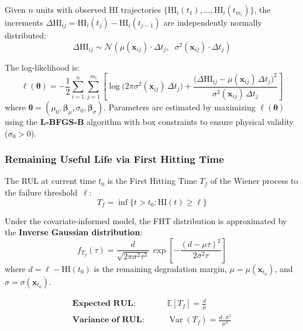 \documentclass[12pt, a4paper]{article}
\newcommand{\E}{\mathbb{E}}
\newcommand{\Var}{\operatorname{Var}}
\newcommand{\HI}{\mathrm{HI}}
\begin{document}
Given $n$ units with observed HI trajectories $\{\HI_i(t_1), \ldots, \HI_i(t_{m_i})\}$, the increments $\Delta\HI_{ij} = \HI_i(t_j) - \HI_i(t_{j-1})$ are independently normally distributed:
\begin{equation}
    \Delta\HI_{ij} \sim \mathcal{N}\!\left(\mu(\mathbf{x}_{ij})\cdot\Delta t_j,\;\; \sigma^2(\mathbf{x}_{ij})\cdot\Delta t_j\right)
\end{equation}

The log-likelihood is:
\begin{equation}\label{eq:wiener-ll}
    \ell(\boldsymbol{\theta}) = -\frac{1}{2}\sum_{i=1}^{n}\sum_{j=1}^{m_i}\left[\log\!\bigl(2\pi\sigma^2(\mathbf{x}_{ij})\,\Delta t_j\bigr) + \frac{\bigl(\Delta\HI_{ij} - \mu(\mathbf{x}_{ij})\,\Delta t_j\bigr)^2}{\sigma^2(\mathbf{x}_{ij})\,\Delta t_j}\right]
\end{equation}
where $\boldsymbol{\theta} = (\mu_0, \boldsymbol{\beta}_\mu, \sigma_0, \boldsymbol{\beta}_\sigma)$. Parameters are estimated by maximizing $\ell(\boldsymbol{\theta})$ using the \textbf{L-BFGS-B} algorithm with box constraints to ensure physical validity ($\sigma_0 > 0$).

\subsubsection{Remaining Useful Life via First Hitting Time}

The RUL at current time $t_0$ is the First Hitting Time $T_f$ of the Wiener process to the failure threshold~$\ell$:
\begin{equation}
    T_f = \inf\{t > t_0 : \HI(t) \geq \ell\}
\end{equation}

Under the covariate-informed model, the FHT distribution is approximated by the \textbf{Inverse Gaussian distribution}:
\begin{equation}\label{eq:fht-ig}
    f_{T_f}(\tau) = \frac{d}{\sqrt{2\pi\sigma^2\tau^3}}\,\exp\!\left[-\frac{(d - \mu\tau)^2}{2\sigma^2\tau}\right]
\end{equation}
where $d = \ell - \HI(t_0)$ is the remaining degradation margin, $\mu = \mu(\mathbf{x}_{t_0})$, and $\sigma = \sigma(\mathbf{x}_{t_0})$.

\begin{align}
    \textbf{Expected RUL:}\qquad & \E[T_f] = \frac{d}{\mu} \label{eq:erul}\\[6pt]
    \textbf{Variance of RUL:}\qquad & \Var(T_f) = \frac{d\cdot\sigma^2}{\mu^3} \label{eq:vrul}
\end{align}
\end{document}
